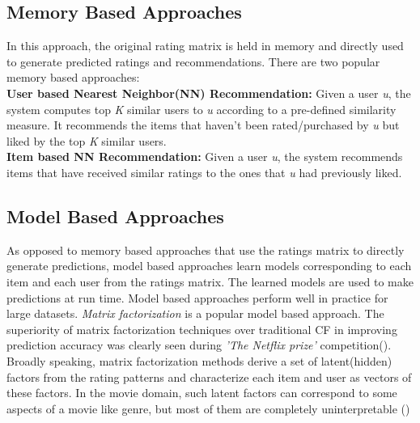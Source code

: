 \subsection {Memory Based Approaches}
In this approach, the original rating matrix is held in memory and directly used to generate predicted ratings and recommendations. There are two popular memory based approaches:\\
\textbf{User based Nearest Neighbor(NN) Recommendation:} Given a user \textit{u}, the system computes top \textit{K} similar users to \textit{u} according to a pre-defined similarity measure. It recommends the items that haven't been rated/purchased by \textit{u} but liked by the top \textit{K} similar users.\\
\textbf{Item based NN Recommendation:} Given a user \textit{u}, the system recommends items that have received similar ratings to the ones that \textit{u} had previously liked.
 


\subsection {Model Based Approaches}
As opposed to memory based approaches that use the ratings matrix to directly generate predictions, model based approaches learn models corresponding to each item and each user from the ratings matrix. The learned models are used to make predictions at run time.
Model based approaches perform well in practice for large datasets.
\textit{Matrix factorization} is a popular model based approach. The superiority of matrix factorization techniques over traditional CF in improving prediction accuracy was clearly seen during \textit{'The Netflix prize'} competition(\cite{koren}).
Broadly speaking, matrix factorization methods derive a set of latent(hidden) factors from the rating patterns and characterize each item and user as vectors of these factors.
In the movie domain, such latent factors can correspond to some aspects of a movie like genre, but most of them are completely uninterpretable (\cite{koren})


